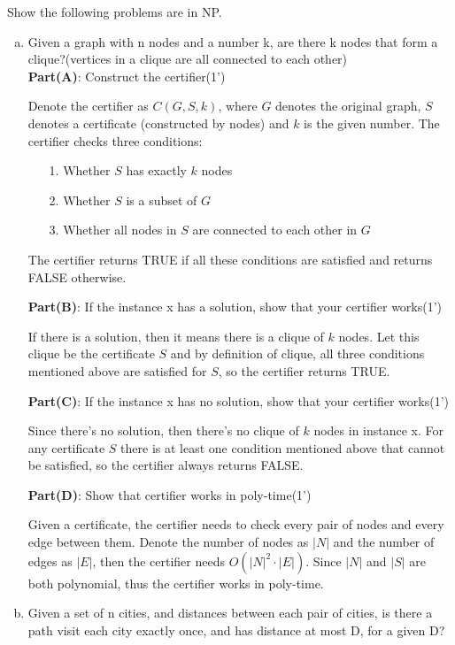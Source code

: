 \documentclass{article}
\begin{document}
Show the following problems are in NP. 
\begin{enumerate}[(a)]
	\item Given a graph with n nodes and a number k, are there k nodes that form a clique?(vertices in a clique are all connected to each other)\\
	\textbf{Part(A)}: Construct the certifier(1')
	{\color{blue}
	\par Denote the certifier as $C(G,S,k)$, where $G$ denotes the original graph, $S$ denotes a certificate (constructed by nodes) and $k$ is the given number. The certifier checks three conditions:
	\begin{enumerate}
		\item[1.] Whether $S$ has exactly $k$ nodes
		\item[2.] Whether $S$ is a subset of $G$
		\item[3.] Whether all nodes in $S$ are connected to each other in $G$
	\end{enumerate}
	\par The certifier returns TRUE if all these conditions are satisfied and returns FALSE otherwise.
	}
	\par\textbf{Part(B)}: If the instance x has a solution, show that your certifier works(1')
	{\color{blue}
	\par If there is a solution, then it means there is a clique of $k$ nodes. Let this clique be the certificate $S$ and by definition of clique, all three conditions mentioned above are satisfied for $S$, so the certifier returns TRUE.
	}
	\par\textbf{Part(C)}: If the instance x has no solution, show that your certifier works(1')
	{\color{blue}
	\par Since there's no solution, then there's no clique of $k$ nodes in instance x. For any certificate $S$ there is at least one condition mentioned above that cannot be satisfied, so the certifier always returns FALSE.
	}
	\par\textbf{Part(D)}: Show that certifier works in poly-time(1')
	{\color{blue}
	\par Given a certificate, the certifier needs to check every pair of nodes and every edge between them. Denote the number of nodes as $|N|$ and the number of edges as $|E|$, then the certifier needs $O({|N|}^2\cdot|E|)$. Since $|N|$ and $|S|$ are both polynomial, thus the certifier works in poly-time.
	}
	\vspace{0.3in}
	\item Given a set of n cities, and distances between each pair of cities, is there a path visit each city exactly once, and has distance at most D, for a given D? \\

\end{enumerate}
\end{document}
